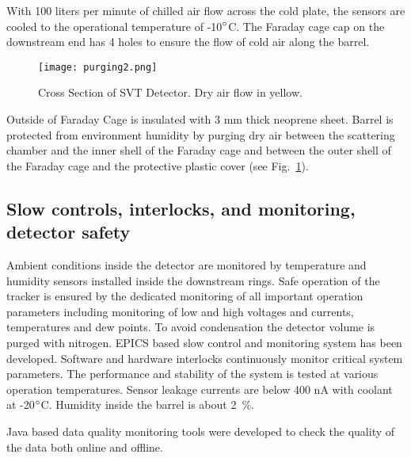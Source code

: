 With 100 liters per minute of chilled air flow across the cold plate, the sensors are cooled to the operational temperature of -10$\degree$C. The Faraday cage cap on the downstream end has 4 holes to ensure the flow of cold air along the barrel. 

\begin{figure}[hbt] 
\centering 
\texttt{[image: purging2.png]}
\caption{Cross Section of SVT Detector.  Dry air flow in yellow.}
\label{fig:purging2}
\end{figure}

Outside of Faraday Cage is insulated with 3 mm thick neoprene sheet. Barrel is protected from environment humidity by purging dry air between the scattering chamber and the inner shell of the Faraday cage and between the outer shell of the Faraday cage and the protective plastic cover (see Fig.~\ref{fig:purging2}). 

\subsection{Slow controls, interlocks, and monitoring, detector safety}

Ambient conditions inside the detector are monitored by temperature and humidity sensors installed inside the downstream rings. 
Safe operation of the tracker is ensured by the dedicated monitoring of all important operation parameters including monitoring of low and high voltages and currents, temperatures and dew points. To avoid condensation the detector volume is purged with nitrogen. EPICS based slow control and monitoring system has been developed. Software and hardware interlocks continuously monitor critical system parameters. The performance and stability of the system is tested at various operation temperatures. Sensor leakage currents are below 400 nA with coolant at -20$\degree$C. Humidity inside the barrel is about 2~$\%$.


Java based data quality monitoring tools were developed to check the quality of the data both online and offline. 

